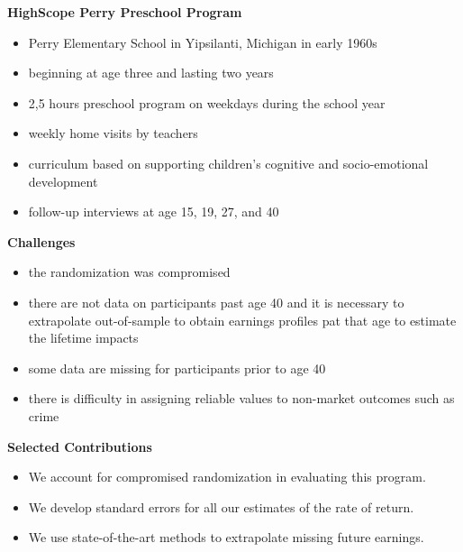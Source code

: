 \begin{frame}\textbf{HighScope Perry Preschool Program}

\begin{itemize}
\item Perry Elementary School in Yipsilanti, Michigan in early 1960s
\item beginning at age three and lasting two years
\item 2,5 hours preschool program on weekdays during the school year
\item weekly home visits by teachers
\item curriculum based on supporting children's cognitive and socio-emotional development
\item follow-up interviews at age 15, 19, 27, and 40
\end{itemize}
\end{frame}
\begin{frame}\textbf{Challenges}
\begin{itemize}
\item the randomization was compromised
\item there are not data on participants past age 40 and it is necessary to extrapolate out-of-sample to obtain earnings profiles pat that age to estimate the lifetime impacts
\item some data are missing for participants prior to age 40
\item there is difficulty in assigning reliable values to non-market outcomes such as crime
\end{itemize}
\end{frame}
\begin{frame}\textbf{Selected Contributions}
\begin{itemize}
\item We account for compromised randomization in evaluating this program.
\item We develop standard errors for all our estimates of the rate of return.
\item We use state-of-the-art methods to extrapolate missing future earnings.
\end{itemize}
\end{frame}

